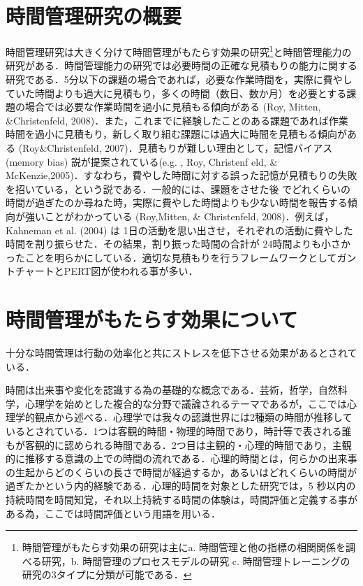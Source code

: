 \section{時間管理研究の概要}
時間管理研究は大きく分けて時間管理がもたらす効果の研究\footnote{時間管理がもたらす効果の研究は主にa. 時間管理と他の指標の相関関係を調べる研究，b. 時間管理のプロセスモデルの研究 c. 時間管理トレーニングの研究の3タイプに分類が可能である．}と時間管理能力の研究がある．時間管理能力の研究では必要時間の正確な見積もりの能力に関する研究である．5分以下の課題の場合であれば，必要な作業時間を，実際に費やしていた時間よりも過大に見積もり，多くの時間（数日、数か月）を必要とする課題の場合では必要な作業時間を過小に見積もる傾向がある (Roy, Mitten, \&Christenfeld, 2008)．また，これまでに経験したことのある課題であれば作業時間を過小に見積もり，新しく取り組む課題には過大に時間を見積もる傾向がある (Roy\&Christenfeld, 2007)．見積もりが難しい理由として，記憶バイアス (memory bias) 説が提案されている(e.g. , Roy, Christenf eld, \& McKenzie,2005)．すなわち，費やした時間に対する誤った記憶が見積もりの失敗を招いている，という説である．一般的には、課題をさせた後
でどれくらいの時間が過ぎたのか尋ねた時，実際に費やした時間よりも少ない時間を報告する傾向が強いことがわかっている (Roy,Mitten, \& Christenfeld, 2008)．例えば，Kahneman et al. (2004) は 1日の活動を思い出させ，それぞれの活動に費やした時間を割り振らせた．その結果，割り振った時間の合計が 24時間よりも小さかったことを明らかにしている．適切な見積もりを行うフレームワークとしてガントチャートとPERT図が使われる事が多い．




\section{時間管理がもたらす効果について}
十分な時間管理は行動の効率化と共にストレスを低下させる効果があるとされている．

時間は出来事や変化を認識する為の基礎的な概念である．芸術，哲学，自然科学，心理学を始めとした複合的な分野で議論されるテーマであるが，ここでは心理学的観点から述べる．心理学では我々の認識世界には2種類の時間が推移しているとされている．1つは客観的時間・物理的時間であり，時計等で表される誰もが客観的に認められる時間である．2つ目は主観的・心理的時間であり，主観的に推移する意識の上での時間の流れである．心理的時間とは，何らかの出来事の生起からどのくらいの長さで時間が経過するか，あるいはどれくらいの時間が過ぎたかという内的経験である\cite{Meck2005}．心理的時間を対象とした研究では，5 秒以内の持続時間を時間知覚，それ以上持続する時間の体験は，時間評価と定義する事がある為\cite{Kato2005}，ここでは時間評価という用語を用いる．

